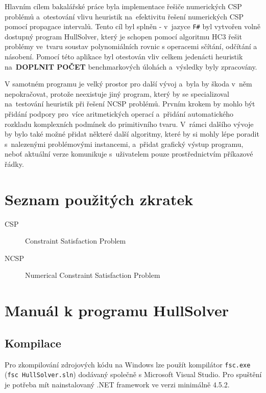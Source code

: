 \documentclass[thesis=B,czech]{FITthesis}[2012/06/26]
\theoremstyle{definition}
\begin{document}
\begin{conclusion}
Hlavním cílem bakalářské práce byla implementace řešiče numerických CSP problémů a~otestování vlivu heuristik na~efektivitu řešení numerických CSP pomocí propagace intervalů. Tento cíl byl splněn - v~jazyce \texttt{F\#} byl vytvořen volně dostupný program HullSolver, který je schopen pomocí algoritmu HC3 řešit problémy ve~tvaru soustav polynomiálních rovnic s operacemi sčítání, odčítání a násobení. Pomocí této aplikace byl otestován vliv celkem jedenácti heuristik na~\textbf{DOPLNIT POČET} benchmarkových úlohách a~výsledky byly zpracovány.

V samotném programu je velký prostor pro další vývoj a~byla by škoda v~něm nepokračovat, protože neexistuje jiný program, který by se specializoval na~testování heuristik při řešení NCSP problémů. Prvním krokem by mohlo být přidání podpory pro~více aritmetických operací a~přidání automatického rozkladu komplexních podmínek do primitivního tvaru. V~rámci dalšího vývoje by bylo také možné přidat některé další algoritmy, které by si mohly lépe poradit s~nalezenými problémovými instancemi, a~přidat grafický výstup programu, neboť aktuální verze komunikuje s~uživatelem pouze prostřednictvím příkazové řádky.




\end{conclusion}




\appendix

\chapter{Seznam použitých zkratek}
\begin{description}
	\item[CSP] Constraint Satisfaction Problem
	\item[NCSP] Numerical Constraint Satisfaction Problem
\end{description}



\chapter{Manuál k programu HullSolver}
\label{hullSolverManual}
\section{Kompilace}
Pro zkompilování zdrojových kódu na Windows lze použít kompilátor \verb|fsc.exe| (\verb|fsc HullSolver.sln|) dodávaný společně s Microsoft Visual Studio. Pro spuštění je potřeba mít nainstalovaný .NET framework ve verzi minimálně 4.5.2.
\end{document}
